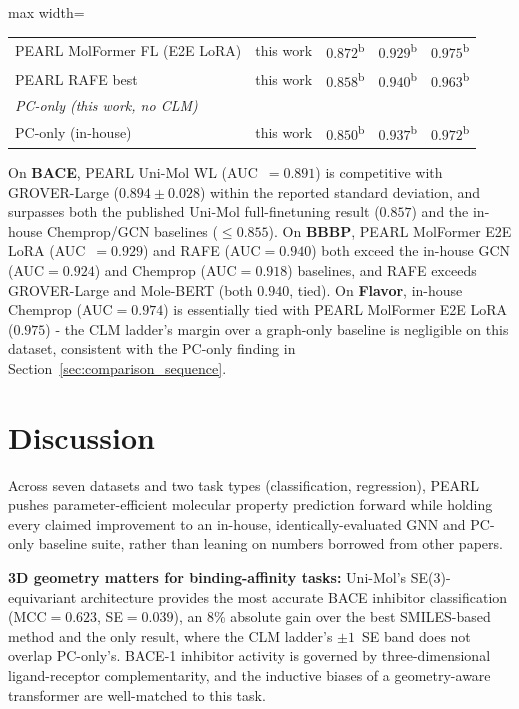 \documentclass[final,1p,times]{elsarticle}
\begin{document}
\begin{table}[!ht]
\begin{adjustbox}{max width=\columnwidth}
\begin{tabular}{llccc}
PEARL MolFormer FL (E2E LoRA) & this work & $0.872$\textsuperscript{b}          & $0.929$\textsuperscript{b} & $\mathbf{0.975}$\textsuperscript{b} \\
PEARL RAFE best               & this work & $0.858$\textsuperscript{b}          & $\mathbf{0.940}$\textsuperscript{b}          & $0.963$\textsuperscript{b} \\
\midrule
\multicolumn{5}{l}{\textit{PC-only (this work, no CLM)}} \\[2pt]
PC-only (in-house)     & this work & $0.850$\textsuperscript{b}          & $0.937$\textsuperscript{b}          & $0.972$\textsuperscript{b} \\
\bottomrule
\end{tabular}
\end{adjustbox}
\end{table}

On \textbf{BACE}, PEARL Uni-Mol WL (AUC~$=0.891$) is competitive with GROVER-Large ($0.894\pm0.028$) within the reported standard deviation, and surpasses both the published Uni-Mol full-finetuning result ($0.857$) and the in-house Chemprop/GCN baselines ($\le0.855$). On \textbf{BBBP}, PEARL MolFormer E2E LoRA (AUC~$=0.929$) and RAFE (AUC$=0.940$) both exceed the in-house GCN (AUC$=0.924$) and Chemprop (AUC$=0.918$) baselines, and RAFE exceeds GROVER-Large and Mole-BERT (both $0.940$, tied). On \textbf{Flavor}, in-house Chemprop (AUC$=0.974$) is essentially tied with PEARL MolFormer E2E LoRA ($0.975$) - the CLM ladder's margin over a graph-only baseline is negligible on this dataset, consistent with the PC-only finding in Section~\ref{sec:comparison_sequence}.

\section{Discussion}
Across seven datasets and two task types (classification, regression), PEARL pushes parameter-efficient molecular property prediction forward while holding every claimed improvement to an in-house, identically-evaluated GNN and PC-only baseline suite, rather than leaning on numbers borrowed from other papers.

\textbf{3D geometry matters for binding-affinity tasks:}
Uni-Mol's SE(3)-equivariant architecture provides the most accurate BACE inhibitor classification (MCC$=0.623$, SE$=0.039$), an 8\% absolute gain over the best SMILES-based method and the only result, where the CLM ladder's $\pm1$~SE band does not overlap PC-only's. BACE-1 inhibitor activity is governed by three-dimensional ligand-receptor complementarity, and the inductive biases of a geometry-aware transformer are well-matched to this task.
\end{document}
